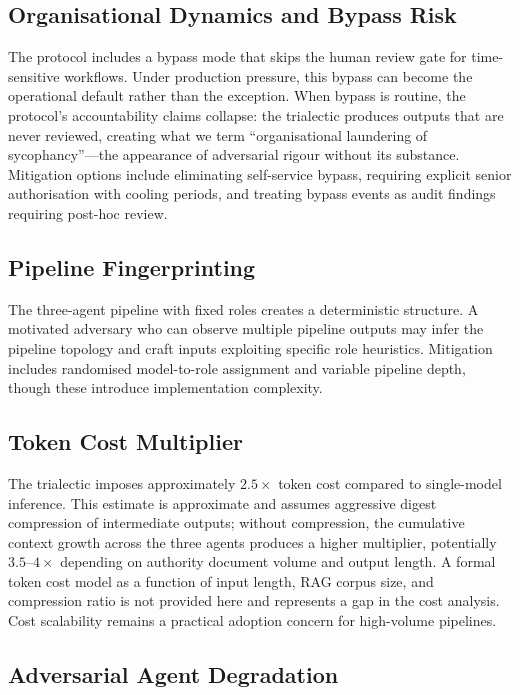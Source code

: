 \documentclass[11pt,a4paper]{article}
\begin{document}
\subsection{Organisational Dynamics and Bypass Risk}

The protocol includes a bypass mode that skips the human review gate
for time-sensitive workflows.  Under production pressure, this bypass
can become the operational default rather than the exception.  When
bypass is routine, the protocol's accountability claims collapse: the
trialectic produces outputs that are never reviewed, creating what we
term ``organisational laundering of sycophancy''---the appearance of
adversarial rigour without its substance.  Mitigation options include
eliminating self-service bypass, requiring explicit senior
authorisation with cooling periods, and treating bypass events as
audit findings requiring post-hoc review.

\subsection{Pipeline Fingerprinting}

The three-agent pipeline with fixed roles creates a deterministic
structure.  A motivated adversary who can observe multiple pipeline
outputs may infer the pipeline topology and craft inputs exploiting
specific role heuristics.  Mitigation includes randomised
model-to-role assignment and variable pipeline depth, though these
introduce implementation complexity.

\subsection{Token Cost Multiplier}

The trialectic imposes approximately $2.5\times$ token cost compared
to single-model inference.  This estimate is approximate and assumes
aggressive digest compression of intermediate outputs; without
compression, the cumulative context growth across the three agents
produces a higher multiplier, potentially $3.5$--$4\times$ depending
on authority document volume and output length.  A formal token cost
model as a function of input length, RAG corpus size, and compression
ratio is not provided here and represents a gap in the cost analysis.
Cost scalability remains a practical adoption concern for high-volume
pipelines.

\subsection{Adversarial Agent Degradation}
\end{document}
